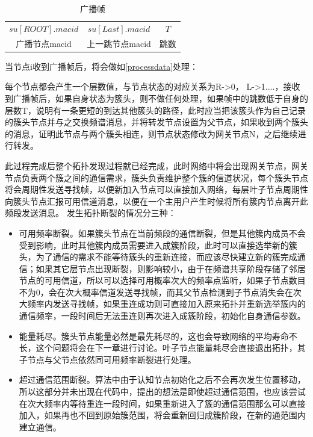 \documentclass[a4paper,AutoFakeBold,oneside,12pt]{book}
\begin{document}
\begin{table}[h]
  \setlength{\belowcaptionskip}{7pt}
  \centering
  \caption{广播帧}
  \begin{tabular}{|c|c|c|} 
  $su[ROOT].macid$&$su[Last].macid$&$T$\\
  广播节点macid&上一跳节点macid&跳数
  \end{tabular}
  \end{table}

  当节点i收到广播帧后，将会做如\ref{processdata}处理：
  
  每个节点都会产生一个层数值，与节点状态的对应关系为R->0， L->1....，接收到广播帧后，如果自身状态为簇头，则不做任何处理，如果帧中的跳数低于自身的层数T，说明有一条更短的到达其他簇头的路径，此时应当把该簇头作为自己记录的簇头节点并与之交换频谱消息，并将转发节点设置为父节点，如果收到两个簇头的消息，证明此节点与两个簇头相连，则节点状态修改为网关节点N，之后继续进行转发。
  
  此过程完成后整个拓扑发现过程就已经完成，此时网络中将会出现网关节点，网关节点负责两个簇之间的通信需求，簇头负责维护整个簇的信道状况，每个簇头节点将会周期性发送寻找帧，以便新加入节点可以直接加入网络，每层叶子节点周期性向簇头节点汇报可用信道消息，以便在一个主用户产生时候将所有簇内节点离开此频段发送消息。
  发生拓扑断裂的情况分三种：
  \begin{itemize}
  \item 可用频率断裂。如果簇头节点在当前频段的通信断裂，但是其他簇内成员不会受到影响，此时其他簇内成员需要进入成簇阶段，此时可以直接选举新的簇头，为了通信的需求不能等待簇头的重新连接，而应该尽快建立新的簇完成通信；如果其它层节点出现断裂，则影响较小，由于在频谱共享阶段存储了邻居节点的可用信道，所以可以选择可用概率次大的频率点监听，如果子节点数目不为0，会在次大概率信道发送寻找帧，而其父节点检测到子节点消失会在次大频率内发送寻找帧，如果重连成功则可直接加入原来拓扑并重新选举簇内的通信频率，一段时间后无法重连则再次进入成簇阶段，初始化自身通信参数。
  \item 能量耗尽。簇头节点能量必然是最先耗尽的，这也会导致网络的平均寿命不长，这个问题将会在下一章进行讨论。叶子节点能量耗尽会直接退出拓扑，其子节点与父节点依然同可用频率断裂进行处理。
  \item 超过通信范围断裂。算法中由于认知节点初始化之后不会再次发生位置移动，所以这部分并未出现在代码中，提出的想法是即使超过通信范围，也应该尝试在次大频率内等待重连一段时间，如果重新进入了簇的通信范围那么可以直接加入，如果再也不回到原始簇范围，将会重新回归成簇阶段，在新的通范围内建立通信。
  \end{itemize}
  
\end{document}
